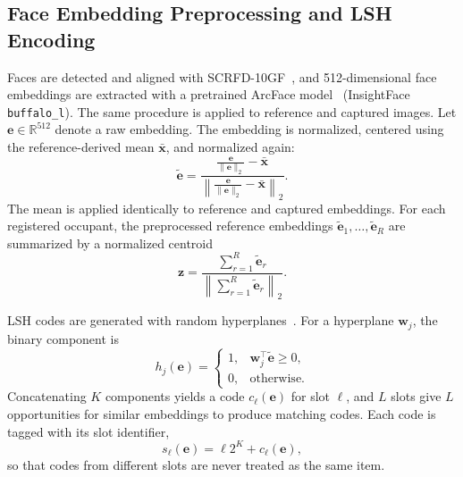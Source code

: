 \documentclass[pdflatex,sn-mathphys-num]{sn-jnl}%
\providecommand{\code}[1]{\texttt{#1}}%
\theoremstyle{thmstyleone}%
\theoremstyle{thmstyletwo}%
\theoremstyle{thmstylethree}%
\begin{document}
\subsection{Face Embedding Preprocessing and LSH Encoding}
\label{subsec:lsh_encoding}

Faces are detected and aligned with SCRFD-10GF~\cite{guo2022}, and 512-dimensional face embeddings are extracted with a pretrained ArcFace model~\cite{deng2019} (InsightFace \code{buffalo\_l}). The same procedure is applied to reference and captured images. Let $\mathbf{e} \in \mathbb{R}^{512}$ denote a raw embedding. The embedding is normalized, centered using the reference-derived mean $\bar{\mathbf{x}}$, and normalized again:
\begin{equation}
    \tilde{\mathbf{e}}
    =
    \frac{
        \frac{\mathbf{e}}{\|\mathbf{e}\|_2}
        - \bar{\mathbf{x}}
    }{
        \left\|
        \frac{\mathbf{e}}{\|\mathbf{e}\|_2}
        - \bar{\mathbf{x}}
        \right\|_2
    }.
    \label{eq:embedding_preprocessing}
\end{equation}
The mean is applied identically to reference and captured embeddings. For each registered occupant, the preprocessed reference embeddings $\tilde{\mathbf{e}}_1,\ldots,\tilde{\mathbf{e}}_R$ are summarized by a normalized centroid
\begin{equation}
    \mathbf{z}
    =
    \frac{
        \sum_{r=1}^{R}\tilde{\mathbf{e}}_r
    }{
        \left\|\sum_{r=1}^{R}\tilde{\mathbf{e}}_r\right\|_2
    }.
    \label{eq:identity_centroid}
\end{equation}

LSH codes are generated with random hyperplanes~\cite{charikar2002}. For a hyperplane $\mathbf{w}_j$, the binary component is
\begin{equation}
    h_j(\mathbf{e}) =
    \begin{cases}
        1, & \mathbf{w}_j^\top\tilde{\mathbf{e}} \geq 0,\\
        0, & \text{otherwise}.
    \end{cases}
    \label{eq:lsh_bit}
\end{equation}
Concatenating $K$ components yields a code $c_\ell(\mathbf{e})$ for slot $\ell$, and $L$ slots give $L$ opportunities for similar embeddings to produce matching codes. Each code is tagged with its slot identifier,
\begin{equation}
    s_\ell(\mathbf{e})
    =
    \ell 2^K + c_\ell(\mathbf{e}),
    \label{eq:tagged_code}
\end{equation}
so that codes from different slots are never treated as the same item.
\end{document}
